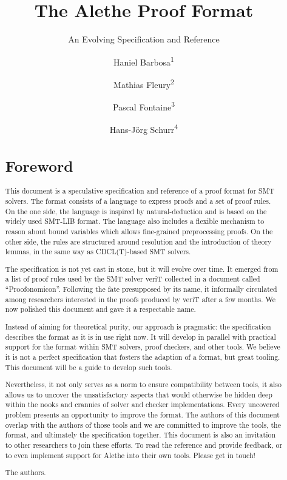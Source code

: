 \documentclass{scrartcl}
\title{The Alethe Proof Format}
\subtitle{An Evolving Specification and Reference}
\author{Haniel Barbosa\textsuperscript{1}
\and Mathias Fleury\textsuperscript{2}
\and Pascal Fontaine\textsuperscript{3}
\and Hans-Jörg Schurr\textsuperscript{4}}
\date{}
\theoremstyle{definition}
\begin{document}
\maketitle
\tableofcontents
\clearpage

\begin{abstract}
\section*{Foreword}
This document is a speculative specification and reference of a proof
format for SMT solvers.  The format consists of a language to express
proofs and a set of proof rules.  On the one side, the language is
inspired by natural-deduction and is based on the widely used SMT-LIB
format.  The language also includes a flexible mechanism to reason
about bound variables which allows fine-grained preprocessing proofs.
%
On the other side, the rules are structured around resolution and the
introduction of theory lemmas, in the same way as CDCL(T)-based SMT
solvers.

The specification is not yet
cast in stone, but it will evolve over time. It emerged from a list
of proof rules used by the SMT solver veriT collected in a document
called ``Proofonomicon''. Following the fate presupposed by its name,
it informally circulated among researchers interested in the proofs
produced by veriT after a few months.  We now polished this document
and gave it a respectable name.

Instead of aiming for theoretical purity, our approach
is pragmatic: the specification describes the format as it is in use
right now. It will develop in parallel with practical support for the
format within SMT solvers, proof checkers, and other tools.  We believe
it is not a perfect specification that fosters the adaption of a format,
but great tooling. This document will be a guide to develop
such tools.

Nevertheless, it not only serves as a norm to ensure compatibility
between tools, it also allows us to uncover the unsatisfactory aspects
that would otherwise be hidden deep within the nooks and crannies of
solver and checker implementations.
%
Every uncovered problem presents an opportunity
to improve the format. The authors of this document overlap with the
authors of those tools and we are committed to improve the tools, the
format, and ultimately the specification together.
This document is also an invitation to other researchers to join
these efforts. To read the reference and provide feedback, or to even
implement support for Alethe into their own tools. Please
get in touch!

\bigskip
\hspace*{\fill}The authors.
\end{abstract}
\end{document}
